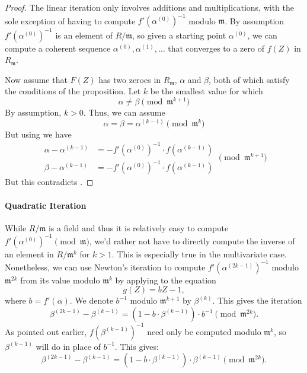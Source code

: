 {\begin{proof}
The linear iteration  only involves
additions and multiplications, with the sole exception of having to
compute $f'(\alpha^{(0)})^{-1}$ modulo $\mathfrak{m}$.  By assumption
$f'(\alpha^{(0)})^{-1}$ is an element of $R/\mathfrak{m}$, so given a
starting point $\alpha^{(0)}$, we can compute a coherent sequence
$\alpha^{(0)}, \alpha^{(1)}, \ldots$ that converges to a zero of
$f(Z)$ in $R_\mathfrak{m}$.  

Now assume that $F(Z)$ has two zeroes in $R_\mathfrak{m}$, $\alpha$ and
$\beta$, both of which satisfy the conditions of the proposition.  Let
$k$ be the smallest value for which 
\begin{equation} \label{UNewton:NotEq:Eq}
\alpha \not= \beta \pmod{\mathfrak{m}^{k+1}}
\end{equation}
By assumption, $k > 0$.   Thus, we can assume
\[
\alpha = \beta = \alpha^{(k-1)} \pmod{\mathfrak{m}^{k}}
\]
But using  we have
\[
\begin{aligned}
\alpha - \alpha^{(k-1)} & = - f'(\alpha^{(0)})^{-1} \cdot
f(\alpha^{(k-1)}) \\
\beta - \alpha^{(k-1)} & = - f'(\alpha^{(0)})^{-1} \cdot f(\alpha^{(k-1)})
\end{aligned}
\pmod{\mathfrak{m}^{k+1}}
\]
But this contradicts .
\end{proof}

\paragraph{Quadratic Iteration}

While $R/\mathfrak{m}$ is a field and thus it is relatively easy to compute
$f'(\alpha^{(0)})^{-1} \pmod{\mathfrak{m}}$, we'd rather not have to directly
compute the inverse of an element in $R/\mathfrak{m}^{k}$ for $k > 1$.  This
is especially true in the multivariate case.
Nonetheless, we can use Newton's iteration to compute
$f'(\alpha^{(2k-1)})^{-1}$ modulo $\mathfrak{m}^{2k}$ from its value modulo
$\mathfrak{m}^k$ by applying  to the equation
\[
g(Z) = bZ - 1,
\]
where $b = f'(\alpha)$.  We denote $b^{-1}$ modulo $\mathfrak{m}^{k+1}$ by
$\beta^{(k)}$.  This gives the iteration
\[
\beta^{(2k-1)} - \beta^{(k-1)} = (1 - b \cdot \beta^{(k-1)}) \cdot
b^{-1} \pmod{\mathfrak{m}^{2k}}.
\]
As pointed out earlier, $f(\beta^{(k-1)})^{-1}$ need only be computed
modulo $\mathfrak{m}^k$, so $\beta^{(k-1)}$ will do in place of $b^{-1}$.
This gives:
\begin{equation}
\beta^{(2k-1)} - \beta^{(k-1)} = (1 - b \cdot \beta^{(k-1)}) \cdot
\beta^{(k-1)} \pmod{\mathfrak{m}^{2k}}. 
\label{EQ:2}
\end{equation}

}
